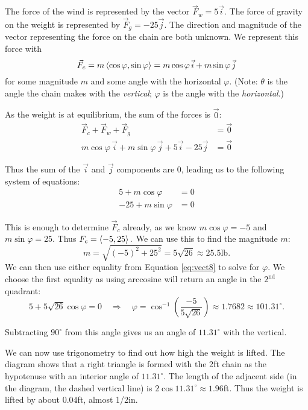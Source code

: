 {The force of the wind is represented by the vector $\vec F_w = 5\vec i$. The force of gravity on the weight is represented by $\vec F_g = -25\vec j$. The direction and magnitude of the vector representing the force on the chain are both unknown. We represent this force with $$\vec F_c = m\left\langle \cos\varphi,\sin\varphi\right\rangle = m\cos\varphi\, \vec i + m\sin\varphi\,\vec j$$ for some magnitude $m$ and some angle with the horizontal $\varphi$. (Note: $\theta$ is the angle the chain makes with the \emph{vertical}; $\varphi$ is the angle with the \emph{horizontal}.)

As the weight is at equilibrium, the sum of the forces is $\vec0$:
\begin{align*}
\vec F_c + \vec F_w + \vec F_g &= \vec 0\\
m\cos\varphi\, \vec i + m\sin\varphi\,\vec j + 5\vec i - 25\vec j &=\vec 0
\end{align*}

 Thus the sum of the $\vec i$ and $\vec j$ components are 0, leading us to the following system of equations:
\begin{equation}
\begin{split}
5+m\cos\varphi &= 0\\
-25+m\sin\varphi &= 0
\end{split}\label{eq:vect8}
\end{equation}

This is enough to determine $\vec F_c$ already, as we know $m\cos \varphi = -5$ and $m\sin\varphi =25$. Thus $F_c = \left\langle -5,25\right\rangle.$ We can use this to find the magnitude $m$:
$$m = \sqrt{(-5)^2+25^2} = 5\sqrt{26}\approx 25.5\text{lb}.$$
We can then use either equality from Equation \eqref{eq:vect8} to solve for $\varphi$. We choose the first equality as using arccosine will return an angle in the $2^\text{nd}$ quadrant:
$$5 + 5\sqrt{26}\cos \varphi = 0 \quad \Rightarrow \quad \varphi = \cos^{-1}\left(\frac{-5}{5\sqrt{26}}\right) \approx 1.7682\approx 101.31^\circ.$$

Subtracting $90^\circ$ from this angle gives us an angle of $11.31^\circ$ with the vertical.

We can now use trigonometry to find out how high the weight is lifted. The diagram shows that a right triangle is formed with the 2ft chain as the hypotenuse with an interior angle of $11.31^\circ$. The length of the adjacent side (in the diagram, the dashed vertical line) is $2\cos 11.31^\circ \approx 1.96$ft. Thus the weight is lifted by about $0.04$ft, almost 1/2in.
}\\

